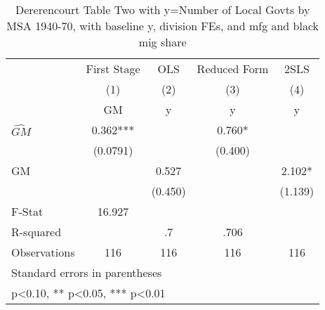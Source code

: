 \begin{table}[htbp]\centering
\def\sym#1{\ifmmode^{#1}\else\(^{#1}\)\fi}
\caption{Dererencourt Table Two with y=Number of Local Govts by MSA 1940-70, with baseline y, division FEs, and mfg and black mig share}
\begin{tabular}{l*{4}{c}}
\toprule
                    & First Stage   &         OLS   &Reduced Form   &        2SLS   \\
                    &\multicolumn{1}{c}{(1)}&\multicolumn{1}{c}{(2)}&\multicolumn{1}{c}{(3)}&\multicolumn{1}{c}{(4)}\\
                    &\multicolumn{1}{c}{GM}&\multicolumn{1}{c}{y}&\multicolumn{1}{c}{y}&\multicolumn{1}{c}{y}\\
\midrule
$\hat{GM}$          &       0.362***&               &       0.760*  &               \\
                    &    (0.0791)   &               &     (0.400)   &               \\
\addlinespace
GM                  &               &       0.527   &               &       2.102*  \\
                    &               &     (0.450)   &               &     (1.139)   \\
\midrule
F-Stat              &      16.927   &               &               &               \\
R-squared           &               &          .7   &        .706   &               \\
Observations        &         116   &         116   &         116   &         116   \\
\bottomrule
\multicolumn{5}{l}{\footnotesize Standard errors in parentheses}\\
\multicolumn{5}{l}{\footnotesize * p<0.10, ** p<0.05, *** p<0.01}\\
\end{tabular}
\end{table}
